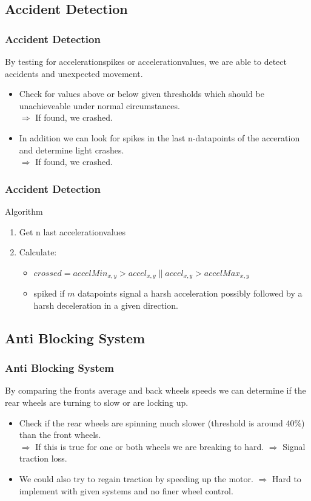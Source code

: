 \documentclass{beamer}
\begin{document}
\subsection{Accident Detection}
\begin{frame}
    \frametitle{Accident Detection}
    By testing for accelerationspikes or accelerationvalues, we are able to detect accidents and unexpected movement.\\
    \begin{itemize}
     \item Check for values above or below given thresholds which should be unachieveable under normal circumstances.\\
     $\Rightarrow$ If found, we crashed.
     \item In addition we can look for spikes in the last n-datapoints of the acceration and determine light crashes.\\
     $\Rightarrow$ If found, we crashed.
    \end{itemize}
\end{frame}
\begin{frame}
    \frametitle{Accident Detection}
    Algorithm
    \begin{enumerate}
        \item Get n last accelerationvalues
        \item Calculate: 
        \begin{itemize}
            \item $crossed = accelMin_{x,y} > accel_{x,y} \parallel accel_{x,y} > accelMax_{x,y}$
            \item spiked if $m$ datapoints signal a harsh acceleration possibly followed by a harsh deceleration in a given direction.
        \end{itemize}
    \end{enumerate}
\end{frame}

\subsection{Anti Blocking System}
\begin{frame}
    \frametitle{Anti Blocking System}
    By comparing the fronts average and back wheels speeds we can determine if the rear wheels are turning to slow or are locking up. 
    \begin{itemize}
     \item Check if the rear wheels are spinning much slower (threshold is around 40\%) than the front wheels.\\
     $\Rightarrow$ If this is true for one or both wheels we are breaking to hard.
     $\Rightarrow$ Signal traction loss.
     \item We could also try to regain traction by speeding up the motor. 
     $\Rightarrow$ Hard to implement with given systems and no finer wheel control. \\
    \end{itemize}
\end{frame}
\end{document}
